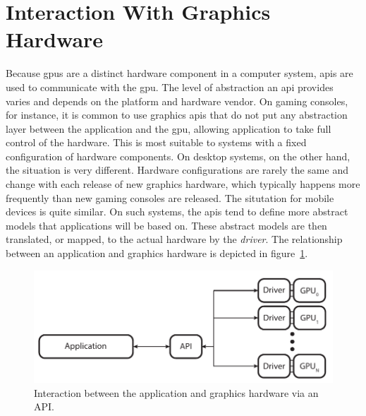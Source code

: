   \section{Interaction With Graphics Hardware}
  \label{sec:HardwareInteraction}
    Because \glspl{gpu} are a distinct hardware component in a computer system, \glspl{api} are used to communicate with the \gls{gpu}.
    The level of abstraction an \gls{api} provides varies and depends on the platform and hardware vendor.
    On gaming consoles, for instance, it is common to use graphics \glspl{api} that do not put any abstraction layer between the application and the \gls{gpu}, allowing application to take full control of the hardware.
    This is most suitable to systems with a fixed configuration of hardware components.
    On desktop systems, on the other hand, the situation is very different.
    Hardware configurations are rarely the same and change with each release of new graphics hardware, which typically happens more frequently than new gaming consoles are released.
    The situtation for mobile devices is quite similar.
    On such systems, the \glspl{api} tend to define more abstract models that applications will be based on.
    These abstract models are then translated, or mapped, to the actual hardware by the \textit{driver}.
    The relationship between an application and graphics hardware is depicted in figure~\ref{fig:AppApiDriverOverview}.

    \begin{figure}
      \label{fig:AppApiDriverOverview}
      \centering
      \includegraphics[width=\textwidth]{Main/Images/Application_API_Driver_Overview}
      \caption{Interaction between the application and graphics hardware via an API.}
    \end{figure}


